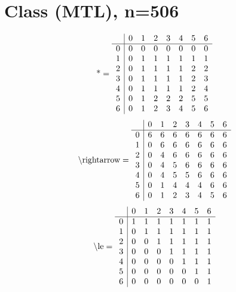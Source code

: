 \documentclass[11pt]{article}
\begin{document}
\section{Class (MTL), n=506}
\[\text{*} = 
\begin{array}{r | r r r r r r r}
 & 0 & 1 & 2 & 3 & 4 & 5 & 6 \\ \hline
0 & 0 & 0 & 0 & 0 & 0 & 0 & 0 \\
1 & 0 & 1 & 1 & 1 & 1 & 1 & 1 \\
2 & 0 & 1 & 1 & 1 & 1 & 2 & 2 \\
3 & 0 & 1 & 1 & 1 & 1 & 2 & 3 \\
4 & 0 & 1 & 1 & 1 & 1 & 2 & 4 \\
5 & 0 & 1 & 2 & 2 & 2 & 5 & 5 \\
6 & 0 & 1 & 2 & 3 & 4 & 5 & 6 \\
\end{array}
\]
\[\text{\textbackslash rightarrow} = 
\begin{array}{r | r r r r r r r}
 & 0 & 1 & 2 & 3 & 4 & 5 & 6 \\ \hline
0 & 6 & 6 & 6 & 6 & 6 & 6 & 6 \\
1 & 0 & 6 & 6 & 6 & 6 & 6 & 6 \\
2 & 0 & 4 & 6 & 6 & 6 & 6 & 6 \\
3 & 0 & 4 & 5 & 6 & 6 & 6 & 6 \\
4 & 0 & 4 & 5 & 5 & 6 & 6 & 6 \\
5 & 0 & 1 & 4 & 4 & 4 & 6 & 6 \\
6 & 0 & 1 & 2 & 3 & 4 & 5 & 6 \\
\end{array}
\]
\[\text{\textbackslash le} = 
\begin{array}{r | r r r r r r r}
 & 0 & 1 & 2 & 3 & 4 & 5 & 6 \\ \hline
0 & 1 & 1 & 1 & 1 & 1 & 1 & 1 \\
1 & 0 & 1 & 1 & 1 & 1 & 1 & 1 \\
2 & 0 & 0 & 1 & 1 & 1 & 1 & 1 \\
3 & 0 & 0 & 0 & 1 & 1 & 1 & 1 \\
4 & 0 & 0 & 0 & 0 & 1 & 1 & 1 \\
5 & 0 & 0 & 0 & 0 & 0 & 1 & 1 \\
6 & 0 & 0 & 0 & 0 & 0 & 0 & 1 \\
\end{array}
\]
\end{document}
